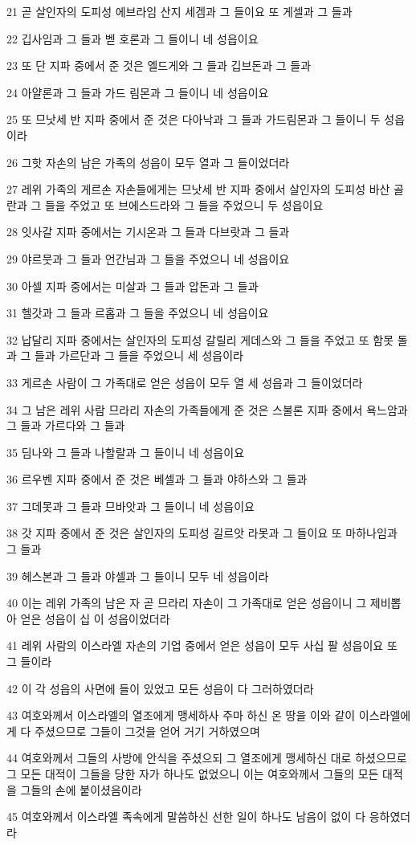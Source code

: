 \par 21 곧 살인자의 도피성 에브라임 산지 세겜과 그 들이요 또 게셀과 그 들과
\par 22 깁사임과 그 들과 벧 호론과 그 들이니 네 성읍이요
\par 23 또 단 지파 중에서 준 것은 엘드게와 그 들과 깁브돈과 그 들과
\par 24 아얄론과 그 들과 가드 림몬과 그 들이니 네 성읍이요
\par 25 또 므낫세 반 지파 중에서 준 것은 다아낙과 그 들과 가드림몬과 그 들이니 두 성읍이라
\par 26 그핫 자손의 남은 가족의 성읍이 모두 열과 그 들이었더라
\par 27 레위 가족의 게르손 자손들에게는 므낫세 반 지파 중에서 살인자의 도피성 바산 골란과 그 들을 주었고 또 브에스드라와 그 들을 주었으니 두 성읍이요
\par 28 잇사갈 지파 중에서는 기시온과 그 들과 다브랏과 그 들과
\par 29 야르뭇과 그 들과 언간님과 그 들을 주었으니 네 성읍이요
\par 30 아셀 지파 중에서는 미살과 그 들과 압돈과 그 들과
\par 31 헬갓과 그 들과 르홉과 그 들을 주었으니 네 성읍이요
\par 32 납달리 지파 중에서는 살인자의 도피성 갈릴리 게데스와 그 들을 주었고 또 함못 돌과 그 들과 가르단과 그 들을 주었으니 세 성읍이라
\par 33 게르손 사람이 그 가족대로 얻은 성읍이 모두 열 세 성읍과 그 들이었더라
\par 34 그 남은 레위 사람 므라리 자손의 가족들에게 준 것은 스불론 지파 중에서 욕느암과 그 들과 가르다와 그 들과
\par 35 딤나와 그 들과 나할랄과 그 들이니 네 성읍이요
\par 36 르우벤 지파 중에서 준 것은 베셀과 그 들과 야하스와 그 들과
\par 37 그데못과 그 들과 므바앗과 그 들이니 네 성읍이요
\par 38 갓 지파 중에서 준 것은 살인자의 도피성 길르앗 라못과 그 들이요 또 마하나임과 그 들과
\par 39 헤스본과 그 들과 야셀과 그 들이니 모두 네 성읍이라
\par 40 이는 레위 가족의 남은 자 곧 므라리 자손이 그 가족대로 얻은 성읍이니 그 제비뽑아 얻은 성읍이 십 이 성읍이었더라
\par 41 레위 사람의 이스라엘 자손의 기업 중에서 얻은 성읍이 모두 사십 팔 성읍이요 또 그 들이라
\par 42 이 각 성읍의 사면에 들이 있었고 모든 성읍이 다 그러하였더라
\par 43 여호와께서 이스라엘의 열조에게 맹세하사 주마 하신 온 땅을 이와 같이 이스라엘에게 다 주셨으므로 그들이 그것을 얻어 거기 거하였으며
\par 44 여호와께서 그들의 사방에 안식을 주셨으되 그 열조에게 맹세하신 대로 하셨으므로 그 모든 대적이 그들을 당한 자가 하나도 없었으니 이는 여호와께서 그들의 모든 대적을 그들의 손에 붙이셨음이라
\par 45 여호와께서 이스라엘 족속에게 말씀하신 선한 일이 하나도 남음이 없이 다 응하였더라

